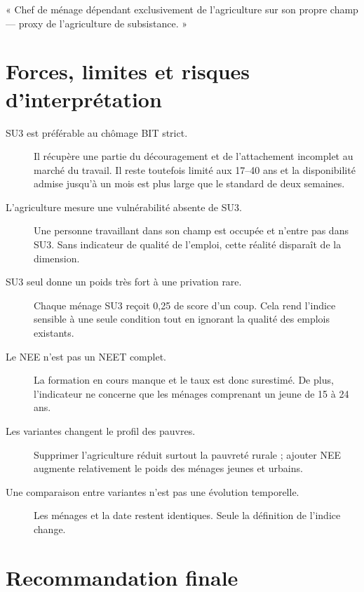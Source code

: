 \documentclass[11pt,a4paper]{article}
\begin{document}
\begin{retenir}
« Chef de ménage dépendant exclusivement de l'agriculture sur son propre champ --- proxy de
l'agriculture de subsistance. »
\end{retenir}

\section{Forces, limites et risques d'interprétation}

\begin{description}
  \item[SU3 est préférable au chômage BIT strict.] Il récupère une partie du découragement et de
  l'attachement incomplet au marché du travail. Il reste toutefois limité aux 17--40 ans et la
  disponibilité admise jusqu'à un mois est plus large que le standard de deux semaines.

  \item[L'agriculture mesure une vulnérabilité absente de SU3.] Une personne travaillant dans son
  champ est occupée et n'entre pas dans SU3. Sans indicateur de qualité de l'emploi, cette réalité
  disparaît de la dimension.

  \item[SU3 seul donne un poids très fort à une privation rare.] Chaque ménage SU3 reçoit 0,25 de
  score d'un coup. Cela rend l'indice sensible à une seule condition tout en ignorant la qualité
  des emplois existants.

  \item[Le NEE n'est pas un NEET complet.] La formation en cours manque et le taux est donc
  surestimé. De plus, l'indicateur ne concerne que les ménages comprenant un jeune de 15 à 24 ans.

  \item[Les variantes changent le profil des pauvres.] Supprimer l'agriculture réduit surtout la
  pauvreté rurale ; ajouter NEE augmente relativement le poids des ménages jeunes et urbains.

  \item[Une comparaison entre variantes n'est pas une évolution temporelle.] Les ménages et la
  date restent identiques. Seule la définition de l'indice change.
\end{description}

\section{Recommandation finale}
\end{document}
